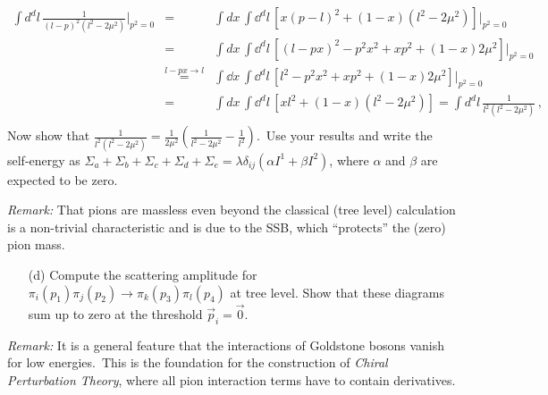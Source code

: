 \documentclass[11pt]{latex/exercise}
\begin{document}
\begin{itemize}
          \begin{eqnarray}
              \int d^d l\,\frac{1}{(l-p)^2\left(l^2-2\mu^2\right)}|_{p^2=0}
              \!\!\!&=&\!\!\!
              \int d x\, \int \dd^d l\, \left[x(p-l)^2+(1-x)(l^2-2\mu^2)\right]|_{p^2=0}
              \nonumber
              \\
              \!\!\!&=&\!\!\!
              \int d x\, \int \dd^d l\, \left[(l-px)^2-p^2x^2+xp^2+(1-x)2\mu^2\right]\big\vert_{p^2=0}
              \nonumber
              \\
              \!\!\!&\overset{l-px\rightarrow l}{=}&\!\!\!
              \int \dd x\, \int \dd^d l\, \left[l^2-p^2x^2+xp^2+(1-x)2\mu^2\right]|_{p^2=0}
              \nonumber
              \\
              \!\!\!&=&\!\!\!
              \int d x\, \int \dd^d l\, \left[xl^2+(1-x)(l^2-2\mu^2)\right]=\int d^d l\,\frac{1}{l^2\left(l^2-2\mu^2\right)}
              \,,
              \nonumber
              \\
          \end{eqnarray}
          Now show that $\frac{1}{l^2\left(l^2-2\mu^2\right)} = \frac{1}{2\mu^2}\left(\frac{1}{l^2-2\mu^2}-\frac{1}{l^2} \right)$.~Use your results and write the self-energy as $\Sigma_{a}+\Sigma_{b}+\Sigma_{c}+\Sigma_{d}+\Sigma_{e} = \lambda \delta_{i j} \left(  \alpha I^1 + \beta I^2 \right)$, where $\alpha$ and $ \beta $ are expected to be zero.
\end{itemize}
\emph{Remark:} That pions are massless even beyond the classical (tree level) calculation  is a non-trivial characteristic and is due to the SSB, which ``protects'' the (zero) pion mass.
\begin{itemize}
    \item[(d)] Compute the scattering amplitude for
          $\pi_i(p_1) \pi_j(p_2) \rightarrow \pi_k(p_3) \pi_l(p_4)$
          at tree level.
          Show that these diagrams sum up to zero at the threshold $\vec{p}_i=\vec{0}$.
\end{itemize}
\emph{Remark:} It is a general feature that the interactions of Goldstone bosons vanish for low energies.~This is the foundation for the construction of \emph{Chiral Perturbation Theory}, where all pion interaction terms have to contain derivatives.
\end{document}
